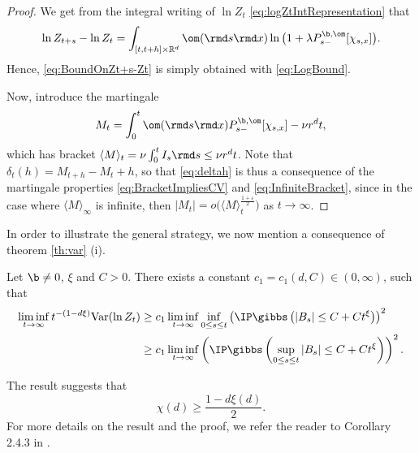 \begin{proof} We get from the integral writing of $\ln Z_t$ \eqref{eq:logZtIntRepresentation} that
\[\ln Z_{t+s} - \ln Z_t = \int_{[t,t+h]\times\mathbb{R}^d} \om(\rmd s \rmd x) \ln \big(1+\lambda P_{s-}^{\b,\om} [\chi_{s,x}]\big).\]
Hence, \eqref{eq:BoundOnZt+s-Zt} is simply obtained with \eqref{eq:LogBound}.

Now, introduce the martingale
\[M_t = \int_0^t \om(\rmd s \rmd x) P_{s-}^{\b,\om}[\chi_{s,x}] - \nu r^dt,\]
which has bracket ${\langle M \rangle_t}=\nu\int_0^t I_s \rmd s \leq \nu r^d t$. Note that $\delta_t(h) = M_{t+h}-M_t + h$, so that \eqref{eq:deltah} is thus a consequence of the martingale properties
\eqref{eq:BracketImpliesCV} and
\eqref{eq:InfiniteBracket}, since in the case where $\langle M \rangle_\infty$ is infinite, then $|M_t| = o\big(\langle M \rangle_t^{\frac{1+\varepsilon}{2}}\big)$ as $t\to\infty$.
\end{proof}
In order to illustrate the general strategy, we now mention a consequence of theorem \ref{th:var} (i). 


\begin{corollary} \label{cor:var2} Let $\b\neq 0$, $\xi$ and $C>0$. There exists a constant $c_1 = c_1(d,C)\in(0,\infty)$, such that 
\begin{align*} \liminf_{t\to\infty}t^{-(1-d\xi)}\mathrm{Var}(\ln Z_t) &\geq c_1 \liminf_{t\to\infty} \inf_{0\leq s \leq t} \left(\IP \gibbs\left(|B_s|\leq C + Ct^\xi\right)\right)^2\\
&\geq c_1 \liminf_{t\to\infty} \left(\IP \gibbs\left(\sup_{0\leq s \leq t} |B_s| \leq C + Ct^\xi\right) \right)^2.
\end{align*}
\end{corollary}
The result suggests that 
$$
\chi(d) \geq \frac{1-d\xi(d)}{2}.
$$
For more details on the result and the proof, we refer the reader to Corollary 2.4.3 in \cite{CY05}.
%
